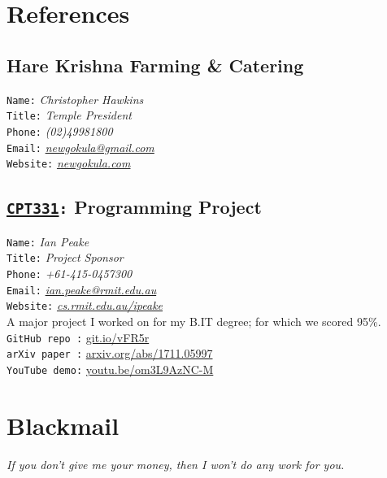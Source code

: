 \documentclass[12pt,a4paper,oneside]{article}
\newcommand{\textapprox}{\raisebox{0.5ex}{\texttildelow}}
\begin{document}
\section{References}
\subsection{Hare Krishna Farming \& Catering}
\texttt{Name\phantom{...}:} \textit{\color{s}Christopher Hawkins}
\\\texttt{Title\phantom{..}:} \textit{\color{s}Temple President}
\\\texttt{Phone\phantom{..}:} \textit{\color{s}(02)49981800}
\\\texttt{Email\phantom{..}:} \textit{\color{s}\href{mailto:newgokula@gmail.com?Subject=Shyam}{newgokula@gmail.com}}
\\\texttt{Website:} \textit{\color{s}\href{http://www.newgokula.com/}{newgokula.com}}
\addtocounter{subsection}{1}
{}
\addtocounter{subsection}{-1}
\subsection{\texttt{\href{https://www.open.edu.au/courses/it/rmit-university-programming-project--cpt331-2017}{CPT331}:} Programming Project}
\texttt{Name\phantom{...}:} \textit{\color{s}Ian Peake}
\\\texttt{Title\phantom{..}:} \textit{\color{s}Project Sponsor}
\\\texttt{Phone\phantom{..}:} \textit{\color{s}+61-415-0457300}
\\\texttt{Email\phantom{..}:} \textit{\color{s}\href{mailto:ian.peake@rmit.edu.au?Subject=Shyam}{ian.peake@rmit.edu.au}}
\\\texttt{Website:} \textit{\color{s}\href{http://www.cs.rmit.edu.au/~ipeake/}{cs.rmit.edu.au/\textapprox{}ipeake}}
\medskip{}\\A major project I worked on for my B.IT degree; for which we scored 95\%.
\\\texttt{GitHub repo :} \href{https://github.com/Pretty-Cure-5/Euclidian}{git.io/vFR5r}
\\\texttt{arXiv paper :} \href{https://arxiv.org/abs/1711.05997}{arxiv.org/abs/1711.05997}
\\\texttt{YouTube demo:} \href{https://www.youtube.com/watch?v=om3L9AzNC-M}{youtu.be/om3L9AzNC-M}

%
%
%

\phantom{menace}
\vfill
\section{Blackmail}
\textit{If you don't give me your money, then I won't do any work for you.}
\end{document}
